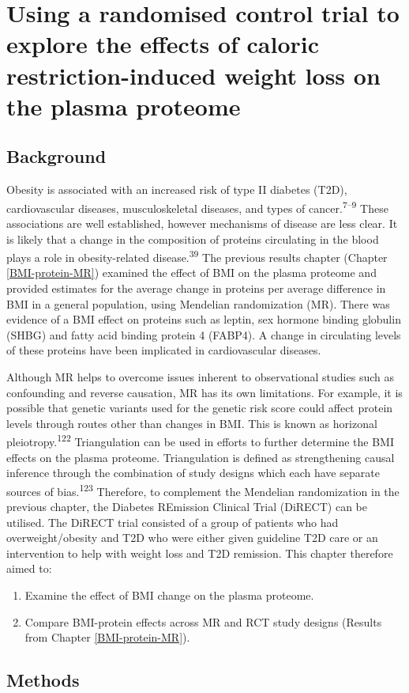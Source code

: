 \documentclass[11pt,twoside]{bristolthesis}
\providecommand{\tightlist}{%
  \setlength{\itemsep}{0pt}\setlength{\parskip}{0pt}}
\begin{document}
\hypertarget{BMI-protein-RCT}{%
\chapter{Using a randomised control trial to explore the effects of caloric restriction-induced weight loss on the plasma proteome}\label{BMI-protein-RCT}}

\hypertarget{background-4}{%
\section{Background}\label{background-4}}

Obesity is associated with an increased risk of type II diabetes (T2D), cardiovascular diseases, musculoskeletal diseases, and types of cancer.\textsuperscript{7--9} These associations are well established, however mechanisms of disease are less clear. It is likely that a change in the composition of proteins circulating in the blood plays a role in obesity-related disease.\textsuperscript{39} The previous results chapter (Chapter \ref{BMI-protein-MR}) examined the effect of BMI on the plasma proteome and provided estimates for the average change in proteins per average difference in BMI in a general population, using Mendelian randomization (MR). There was evidence of a BMI effect on proteins such as leptin, sex hormone binding globulin (SHBG) and fatty acid binding protein 4 (FABP4). A change in circulating levels of these proteins have been implicated in cardiovascular diseases.

Although MR helps to overcome issues inherent to observational studies such as confounding and reverse causation, MR has its own limitations. For example, it is possible that genetic variants used for the genetic risk score could affect protein levels through routes other than changes in BMI. This is known as horizonal pleiotropy.\textsuperscript{122} Triangulation can be used in efforts to further determine the BMI effects on the plasma proteome. Triangulation is defined as strengthening causal inference through the combination of study designs which each have separate sources of bias.\textsuperscript{123} Therefore, to complement the Mendelian randomization in the previous chapter, the Diabetes REmission Clinical Trial (DiRECT) can be utilised. The DiRECT trial consisted of a group of patients who had overweight/obesity and T2D who were either given guideline T2D care or an intervention to help with weight loss and T2D remission. This chapter therefore aimed to:
\begin{enumerate}
\def\labelenumi{\arabic{enumi})}
\tightlist
\item
  Examine the effect of BMI change on the plasma proteome.
\item
  Compare BMI-protein effects across MR and RCT study designs (Results from Chapter \ref{BMI-protein-MR}).
\end{enumerate}
\hypertarget{methods-4}{%
\section{Methods}\label{methods-4}}
\end{document}

